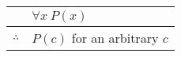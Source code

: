\documentclass{standalone}
\begin{document}
\begin{tabular}{rl}
    & $\forall x\ P\left(x\right)$ \\
    \hline
    $\therefore$ & $P\left(c\right)$ for an arbitrary $c$
\end{tabular}
\end{document}
